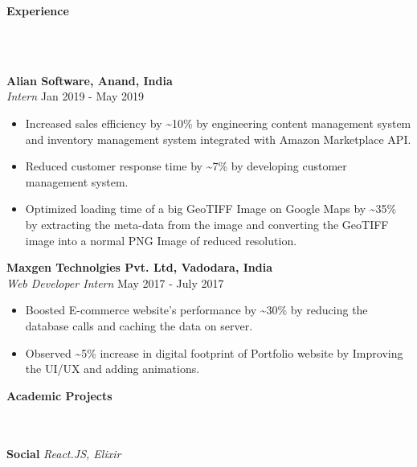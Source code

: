 \documentclass[]{article}
\newcommand{\lineunder} {
    \vspace*{-8pt} \\
    \hrulefill \\
}
\newcommand{\header} [1] {
    {\vspace*{6pt} \fontsize{12}{12}\selectfont \textbf{#1}}
     \lineunder
}
\begin{document}
\header{Experience}
\vspace{1mm}

\hspace{1mm}
\textbf{Alian Software, Anand, India}\\
\hspace{1mm}
\textit{Intern} \hfill Jan 2019 - May 2019\\
\vspace{-2mm}
\begin{itemize}
    \setlength\itemsep{0.2mm}
	\item Increased sales efficiency by \textasciitilde{}10\% by engineering content management system and inventory management system integrated with Amazon Marketplace API.
	\item Reduced customer response time by \textasciitilde{}7\% by developing customer management system.
	\item Optimized loading time of a big GeoTIFF Image on Google Maps by \textasciitilde{}35\% by extracting the meta-data from the image and converting the GeoTIFF image into a normal PNG Image of reduced resolution.
\end{itemize}
\hspace{1mm}
\textbf{Maxgen Technolgies Pvt. Ltd, Vadodara, India}\\
\hspace{1mm}
\textit{Web Developer Intern} \hfill May 2017 - July 2017\\
\vspace{-2mm}
\begin{itemize}
    \setlength\itemsep{0.2mm}
	\item Boosted E-commerce website's performance by \textasciitilde{}30\% by reducing the database calls and caching the data on server.
	\item Observed \textasciitilde{}5\% increase in digital footprint of Portfolio website by Improving the UI/UX and adding animations.
\end{itemize}



\header{Academic Projects}
{\hspace{2mm}\textbf{Social}} {\sl React.JS, Elixir} \\
\end{document}
